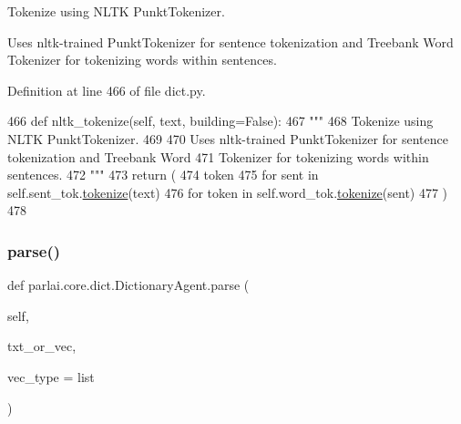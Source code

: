 \begin{DoxyVerb}Tokenize using NLTK PunktTokenizer.

Uses nltk-trained PunktTokenizer for sentence tokenization and Treebank Word
Tokenizer for tokenizing words within sentences.
\end{DoxyVerb}
 

Definition at line 466 of file dict.\+py.


\begin{DoxyCode}
466     \textcolor{keyword}{def }nltk\_tokenize(self, text, building=False):
467         \textcolor{stringliteral}{"""}
468 \textcolor{stringliteral}{        Tokenize using NLTK PunktTokenizer.}
469 \textcolor{stringliteral}{}
470 \textcolor{stringliteral}{        Uses nltk-trained PunktTokenizer for sentence tokenization and Treebank Word}
471 \textcolor{stringliteral}{        Tokenizer for tokenizing words within sentences.}
472 \textcolor{stringliteral}{        """}
473         \textcolor{keywordflow}{return} (
474             token
475             \textcolor{keywordflow}{for} sent \textcolor{keywordflow}{in} self.sent\_tok.\hyperlink{namespaceparlai_1_1agents_1_1tfidf__retriever_1_1build__tfidf_a1fdb457e98eb4e4c26047e229686a616}{tokenize}(text)
476             \textcolor{keywordflow}{for} token \textcolor{keywordflow}{in} self.word\_tok.\hyperlink{namespaceparlai_1_1agents_1_1tfidf__retriever_1_1build__tfidf_a1fdb457e98eb4e4c26047e229686a616}{tokenize}(sent)
477         )
478 
\end{DoxyCode}
\mbox{\label{classparlai_1_1core_1_1dict_1_1DictionaryAgent_ad34c4135329f6768d22d519c3c483d68}} 
\subsubsection{\texorpdfstring{parse()}{parse()}}
{\footnotesize\ttfamily def parlai.\+core.\+dict.\+Dictionary\+Agent.\+parse (\begin{DoxyParamCaption}\item[{}]{self,  }\item[{}]{txt\+\_\+or\+\_\+vec,  }\item[{}]{vec\+\_\+type = {\ttfamily list} }\end{DoxyParamCaption})}

